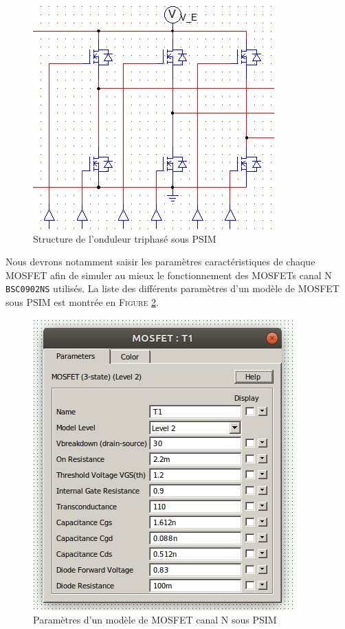 		\begin{figure}[h]
			\begin{center}
				\includegraphics[scale=0.5]{../Illus/bridge_struct_psim.png}
			\end{center}
			\vspace{-1em}
			\caption{Structure de l'onduleur triphasé sous \textsc{PSIM}}
			\label{bridge_struct_psim}
		\end{figure}
		
		Nous devrons notamment saisir les paramètres caractéristiques
		de chaque MOSFET afin de simuler au mieux le fonctionnement
		des MOSFETs canal N \texttt{BSC0902NS} utilisés.
		La liste des différents paramètres d'un modèle de MOSFET sous 
		\textsc{PSIM} est montrée en \textsc{Figure \ref{mosfet_model_psim}}.
		
		\begin{figure}[h]
			\begin{center}
				\includegraphics[scale=0.65]{../Illus/mosfet_model_psim.png}
			\end{center}
			\vspace{-1em}
			\caption{Paramètres d'un modèle de MOSFET canal N sous \textsc{PSIM}}
			\label{mosfet_model_psim}
		\end{figure}			
				

